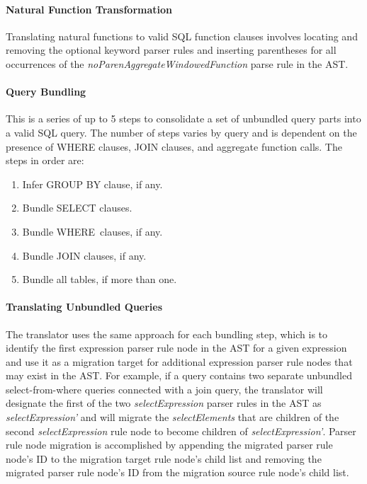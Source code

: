 \paragraph{\textbf{Natural Function Transformation}}
Translating natural functions to valid SQL function clauses involves locating and removing the optional keyword parser rules and inserting parentheses for all occurrences of the \emph{noParenAggregateWindowedFunction} parse rule in the AST.

\paragraph{\textbf{Query Bundling}}
This is a series of up to 5 steps to consolidate a set of unbundled query parts into a valid SQL query. 
The number of steps varies by query and is dependent on the presence of WHERE clauses, JOIN clauses, and aggregate function calls. 
The steps in order are:

\begin{enumerate}
\item Infer GROUP BY clause, if any.

\item Bundle SELECT clauses. 

\item Bundle WHERE clauses, if any.

\item Bundle JOIN clauses, if any.

\item Bundle all tables, if more than one.

\end{enumerate}


\ReplaceSynonymsAlgorithm
\ReorderParseTreeAlgorithm
\ReorderModifiersAlgorithm
\TransformNaturalFunctions

\paragraph{Translating Unbundled Queries}

The translator uses the same approach for each bundling step, which is to identify the first expression parser rule node in the AST for a given expression and use it as a migration target for additional expression parser rule nodes that may exist in the AST. For example, if a query contains two separate unbundled select-from-where queries connected with a join query, the translator will designate the first of the two \emph{selectExpression} parser rules in the AST as \emph{selectExpression'} and will migrate the \emph{selectElements} that are children of the second \emph{selectExpression} rule node to become children of \emph{selectExpression'}. 
Parser rule node migration is accomplished by appending the migrated parser rule node's ID to the migration target rule node's child list and removing the migrated parser rule node's ID from the migration source rule node's child list.

